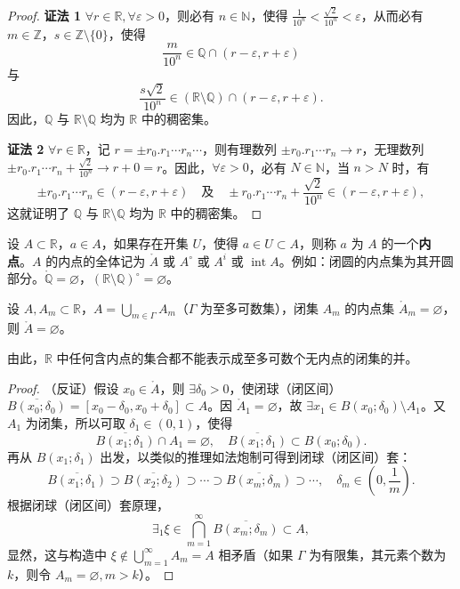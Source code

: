 \begin{proof}
\textbf{证法 1} $\forall r \in \mathbb{R}, \forall \varepsilon > 0$，则必有 $n \in \mathbb{N}$，使得 $\frac{1}{10^n} < \frac{\sqrt{2}}{10^n} < \varepsilon$，从而必有 $m \in \mathbb{Z}$，$s \in \mathbb{Z} \setminus \{0\}$，使得
\[
\frac{m}{10^n} \in \mathbb{Q} \cap (r - \varepsilon, r + \varepsilon)
\]
与
\[
\frac{s\sqrt{2}}{10^n} \in (\mathbb{R} \setminus \mathbb{Q}) \cap (r - \varepsilon, r + \varepsilon).
\]
因此，$\mathbb{Q}$ 与 $\mathbb{R} \setminus \mathbb{Q}$ 均为 $\mathbb{R}$ 中的稠密集。

\textbf{证法 2} $\forall r \in \mathbb{R}$，记 $r = \pm r_0.r_1\cdots r_n\cdots$，则有理数列 $\pm r_0.r_1\cdots r_n \to r$，无理数列 $\pm r_0.r_1\cdots r_n + \frac{\sqrt{2}}{10^n} \to r + 0 = r$。因此，$\forall \varepsilon > 0$，必有 $N \in \mathbb{N}$，当 $n > N$ 时，有
\[
\pm r_0.r_1\cdots r_n \in (r - \varepsilon, r + \varepsilon)\quad \text{及}\quad \pm r_0.r_1\cdots r_n + \frac{\sqrt{2}}{10^n} \in (r - \varepsilon, r + \varepsilon),
\]
这就证明了 $\mathbb{Q}$ 与 $\mathbb{R} \setminus \mathbb{Q}$ 均为 $\mathbb{R}$ 中的稠密集。
\end{proof}

\begin{definition}\label{def:1.3.9}
设 $A \subset \mathbb{R}$，$a \in A$，如果存在开集 $U$，使得 $a \in U \subset A$，则称 $a$ 为 $A$ 的一个\textbf{内点}。$A$ 的内点的全体记为 $\mathring{A}$ 或 $A^\circ$ 或 $A^i$ 或 $\operatorname{int} A$。例如：闭圆的内点集为其开圆部分。$\mathring{\mathbb{Q}} = \varnothing$，$(\mathbb{R} \setminus \mathbb{Q})^\circ = \varnothing$。
\end{definition}

\begin{theorem}\label{thm:1.3.6}
设 $A, A_m \subset \mathbb{R}$，$A = \bigcup\limits_{m \in \Gamma} A_m$（$\Gamma$ 为至多可数集），闭集 $A_m$ 的内点集 $\mathring{A}_m = \varnothing$，则 $\mathring{A} = \varnothing$。

由此，$\mathbb{R}$ 中任何含内点的集合都不能表示成至多可数个无内点的闭集的并。
\end{theorem}

\begin{proof}
（反证）假设 $x_0 \in \mathring{A}$，则 $\exists \delta_0 > 0$，使闭球（闭区间）$\overline{B(x_0; \delta_0)} = [x_0 - \delta_0, x_0 + \delta_0] \subset A$。因 $\mathring{A}_1 = \varnothing$，故 $\exists x_1 \in B(x_0; \delta_0) \setminus A_1$。又 $A_1$ 为闭集，所以可取 $\delta_1 \in (0, 1)$，使得
\[
\overline{B(x_1; \delta_1)} \cap A_1 = \varnothing,\quad \overline{B(x_1; \delta_1)} \subset B(x_0; \delta_0).
\]
再从 $B(x_1; \delta_1)$ 出发，以类似的推理如法炮制可得到闭球（闭区间）套：
\[
\overline{B(x_1; \delta_1)} \supset \overline{B(x_2; \delta_2)} \supset \cdots \supset \overline{B(x_m; \delta_m)} \supset \cdots,\quad \delta_m \in \left(0, \frac{1}{m}\right).
\]
根据闭球（闭区间）套原理，
\[
\exists_1 \xi \in \bigcap_{m=1}^\infty \overline{B(x_m; \delta_m)} \subset A,
\]
显然，这与构造中 $\xi \notin \bigcup\limits_{m=1}^\infty A_m = A$ 相矛盾（如果 $\Gamma$ 为有限集，其元素个数为 $k$，则令 $A_m = \varnothing, m > k$）。
\end{proof}

